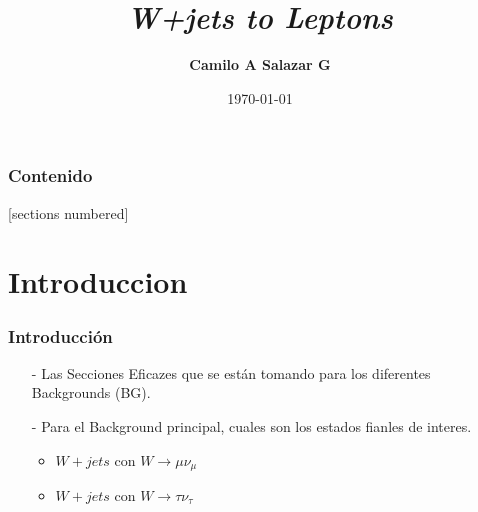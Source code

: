 \documentclass{beamer}
\title{\textbf{ \textit{W+jets to Leptons}}}
\author[C.Salazar]{\textbf{Camilo A Salazar G} }
\institute[UdeA]{camilo.salazar@cern.ch}
\date{\today}
\numberwithin{figure}{section}
\begin{document}

\begin{frame}[plain,t]
\titlepage
\end{frame}



\begin{frame}
  \addtocounter{framenumber}{-1}
  \scriptsize
  \frametitle{Contenido}
  [sections numbered]
  \tableofcontents[hideallsubsections]
\end{frame}


\section{Introduccion}
\begin{frame}
\frametitle{Introducción}


\begin{itemize}
	\item[-] Las Secciones Eficazes que se están tomando para los diferentes Backgrounds (BG).
	\item[-] Para el Background principal, cuales son los estados fianles de interes.
	\begin{itemize}
		\item $W+jets$ con $W \rightarrow \mu \nu_{\mu}$
		\item $W+jets$ con $W \rightarrow \tau \nu_{\tau}$
	\end{itemize}
\end{itemize} 

\end{frame}

\end{document}

